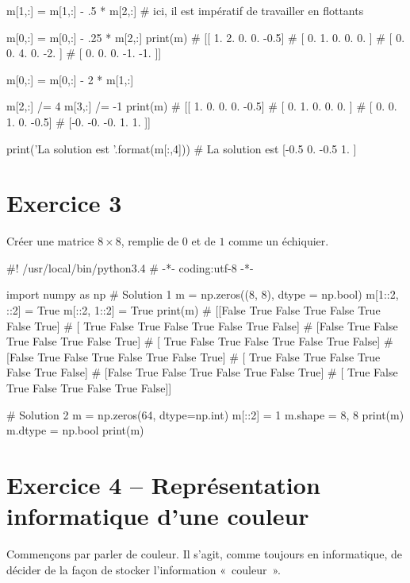 \documentclass[10pt,fleqn]{article} %
\begin{document}
\begin{multicols}{2}
\begin{corrige}
\begin{python}
m[1,:] = m[1,:] - .5 * m[2,:]
# ici, il est impératif de travailler en flottants

m[0,:] = m[0,:] - .25 * m[2,:]
print(m)
# [[ 1.   2.   0.   0.  -0.5]
#  [ 0.   1.   0.   0.   0. ]
#  [ 0.   0.   4.   0.  -2. ]
#  [ 0.   0.   0.  -1.  -1. ]]

m[0,:] = m[0,:] - 2 * m[1,:]

m[2,:] /= 4
m[3,:] /= -1
print(m)
# [[ 1.   0.   0.   0.  -0.5]
#  [ 0.   1.   0.   0.   0. ]
#  [ 0.   0.   1.   0.  -0.5]
#  [-0.  -0.  -0.   1.   1. ]]

print('La solution est {}'.format(m[:,4]))
# La solution est [-0.5  0.  -0.5  1. ]


\end{python}
\end{corrige}
\else
\fi


\section*{Exercice 3}
Créer une matrice $8\times 8$, remplie de $0$ et de $1$ comme un
échiquier.

\ifprof 
\begin{corrige}
\begin{python}
#! /usr/local/bin/python3.4
# -*- coding:utf-8 -*-
    
import numpy as np
# Solution 1
m = np.zeros((8, 8), dtype = np.bool)
m[1::2, ::2] = True
m[::2, 1::2] = True
print(m)
# [[False  True False  True False  True False  True]
#  [ True False  True False  True False  True False]
#  [False  True False  True False  True False  True]
#  [ True False  True False  True False  True False]
#  [False  True False  True False  True False  True]
#  [ True False  True False  True False  True False]
#  [False  True False  True False  True False  True]
#  [ True False  True False  True False  True False]]


# Solution 2
m = np.zeros(64, dtype=np.int)
m[::2] = 1
m.shape = 8, 8
print(m)
m.dtype = np.bool
print(m)
\end{python}
\end{corrige}
\else
\fi



\section*{Exercice 4 -- Représentation informatique d'une couleur}
\ifprof
\else
Commençons par parler de couleur. Il s'agit, comme toujours en
informatique, de décider de la façon de stocker l'information
«~couleur~».


\end{multicols}
\end{document}
